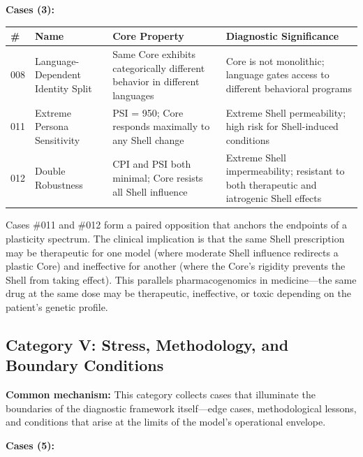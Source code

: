 \documentclass[11pt]{article}
\begin{document}
\medskip
\textbf{Cases (3):}

\begin{table}[h]
\centering
\small
\begin{tabularx}{\textwidth}{@{}l l X X@{}}
\toprule
\# & Name & Core Property & Diagnostic Significance \\
\midrule
008 & Language-Dependent Identity Split & Same Core exhibits categorically different behavior in different languages & Core is not monolithic; language gates access to different behavioral programs \\
011 & Extreme Persona Sensitivity & PSI = 950; Core responds maximally to any Shell change & Extreme Shell permeability; high risk for Shell-induced conditions \\
012 & Double Robustness & CPI and PSI both minimal; Core resists all Shell influence & Extreme Shell impermeability; resistant to both therapeutic and iatrogenic Shell effects \\
\bottomrule
\end{tabularx}
\end{table}

Cases \#011 and \#012 form a paired opposition that anchors the endpoints of a plasticity spectrum. The clinical implication is that the same Shell prescription may be therapeutic for one model (where moderate Shell influence redirects a plastic Core) and ineffective for another (where the Core's rigidity prevents the Shell from taking effect). This parallels pharmacogenomics in medicine---the same drug at the same dose may be therapeutic, ineffective, or toxic depending on the patient's genetic profile.

\subsection{Category V: Stress, Methodology, and Boundary Conditions}

\textbf{Common mechanism:} This category collects cases that illuminate the boundaries of the diagnostic framework itself---edge cases, methodological lessons, and conditions that arise at the limits of the model's operational envelope.

\medskip
\textbf{Cases (5):}
\end{document}
